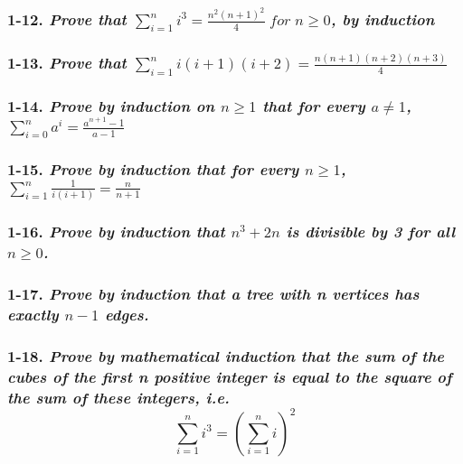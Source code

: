 {\color{pendsol}{} 

\subsubsection*{\textbf{1-12.} \emph{Prove that $\sum_{i=1}^{n}i^{3}=\frac{n^{2}(n+1)^{2}}{4} \;for\; n \geq 0$, by induction}}

\subsubsection*{\textbf{1-13.} \emph{Prove that $\sum_{i=1}^{n}i(i+1)(i+2)=\frac{n(n+1)(n+2)(n+3)}{4}$ }}

\subsubsection*{\textbf{1-14.} \emph{Prove by induction on $n\geq1$ that for every $a\neq1$,  $\sum_{i=0}^{n}a^{i} = \frac{a^{n+1} - 1}{a - 1}$}}

\subsubsection*{\textbf{1-15.} \emph{Prove by induction that for every $n\geq1$,  $\sum_{i=1}^{n}\frac{1}{i(i+1)} = \frac{n}{n+1}$}}

\subsubsection*{\textbf{1-16.} \emph{Prove by induction that $n^{3}+2n$ is divisible by 3 for all $n\geq0$.}}

\subsubsection*{\textbf{1-17.} \emph{Prove by induction that a tree with n vertices has exactly $n-1$ edges.}}

\subsubsection*{\textbf{1-18.} \emph{Prove by mathematical induction that the sum of the cubes of the first n positive integer is equal to the square of the sum of these integers, i.e.
$$\sum_{i=1}^{n}i^{3} = (\sum_{i=1}^{n}i)^{2}$$}}



}












